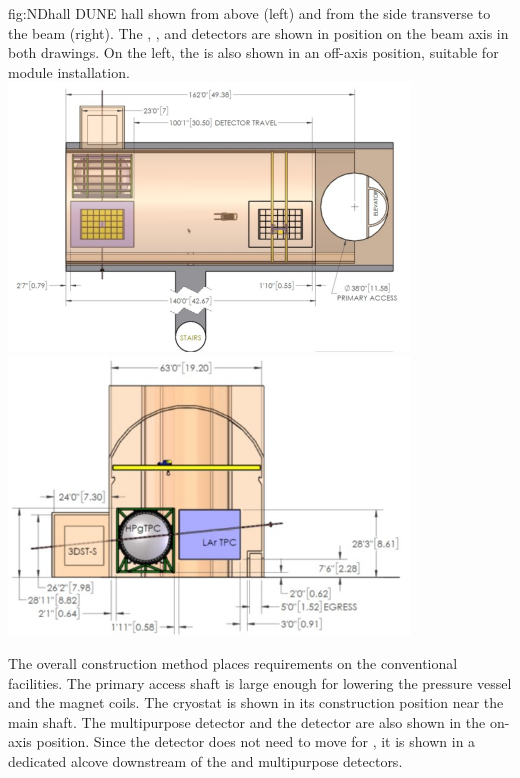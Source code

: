 \begin{dunefigure}{fig:NDhall}
{DUNE   hall shown from above (left) and from the side transverse to the beam (right). The , , and  detectors are shown in position on the beam axis in both drawings.  On the left, the  is also shown in an off-axis position, suitable for module installation. }
\includegraphics[width=0.8\textwidth]{graphics/NDhall1.jpg}
\includegraphics[width=0.8\textwidth]{graphics/NDhall2.jpg}
\end{dunefigure}

The overall construction method places requirements on the conventional facilities. 
The primary access shaft is large enough for lowering the pressure vessel and the magnet coils. The  cryostat is shown in its construction position near the main shaft. The multipurpose detector and the  detector are also shown in the on-axis position. Since the  detector does not need to move for , it is shown in a dedicated alcove downstream of the  and multipurpose detectors.

